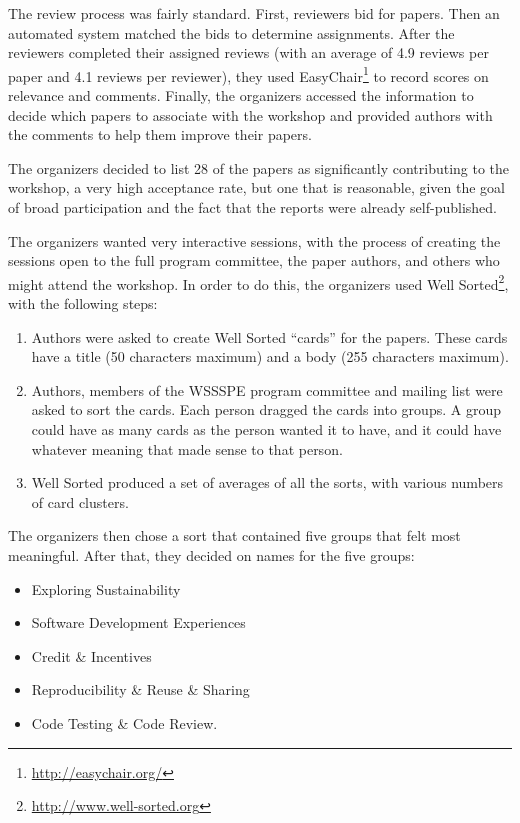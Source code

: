 \documentclass[11pt, oneside]{amsart}
\begin{document}
The review process was fairly standard. First, reviewers bid for papers. Then an
automated system matched the bids to determine assignments. After the reviewers
completed their assigned reviews (with an average of 4.9 reviews per paper and
4.1 reviews per reviewer), they used
EasyChair\footnote{\url{http://easychair.org/}} to record scores on relevance
and comments. Finally, the organizers accessed the information to decide which
papers to associate with the workshop and provided authors with the comments to
help them improve their papers.

The organizers decided to list 28 of the papers as significantly contributing to
the workshop, a very high acceptance rate, but one that is reasonable, given the
goal of broad participation and the fact that the reports were already
self-published.

The organizers wanted very interactive sessions, with the process of creating
the sessions open to the full program committee, the paper authors, and others
who might attend the workshop. In order to do this, the organizers used Well
Sorted\footnote{\url{http://www.well-sorted.org}}, with the following steps:
\begin{enumerate}
%
\item Authors were asked to create Well Sorted ``cards'' for the papers. These
cards have a title (50 characters maximum) and a body (255 characters maximum).
%
\item Authors, members of the WSSSPE program committee and mailing list
were asked to sort the cards. Each person dragged the cards into
groups. A group could have as many cards as the person wanted it to have, and it
could have whatever meaning that made sense to that person.
%
\item Well Sorted produced a set of averages of all the sorts, with
various numbers of card clusters.
%
\end{enumerate}

The organizers then chose a sort that contained five groups that felt most
meaningful. After that, they decided on names for the five groups:
\begin{itemize}
\item Exploring Sustainability
\item Software Development Experiences
\item Credit \& Incentives
\item Reproducibility \& Reuse \& Sharing
\item Code Testing \& Code Review.
\end{itemize}
\end{document}
